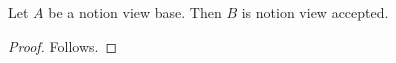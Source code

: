 

\begin{proposition}\label{notion_view_frontier_missing}
    Let $A$ be a notion view base.
    Then $B$ is notion view accepted.
\end{proposition}
\begin{proof}
    Follows.
\end{proof}
